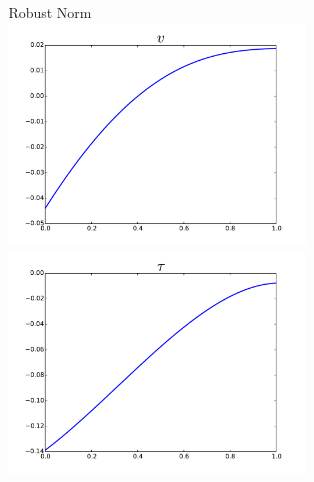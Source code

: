 \documentclass[18pt,xcolor=table]{beamer}
\begin{document}
\begin{frame}[t]
\begin{columns}
\begin{column}{0.5\textwidth}
\begin{figure}[t]
\end{figure}
\end{column}
\begin{column}{0.5\textwidth}
\begin{figure}[t]
\centering
Robust Norm
\includegraphics[width=0.8\textwidth]{OptimalTestFunctions/Robust_v}\\
\includegraphics[width=0.8\textwidth]{OptimalTestFunctions/Robust_tau}
\end{figure}
\end{column}
\end{columns}
\end{frame}
\end{document}
